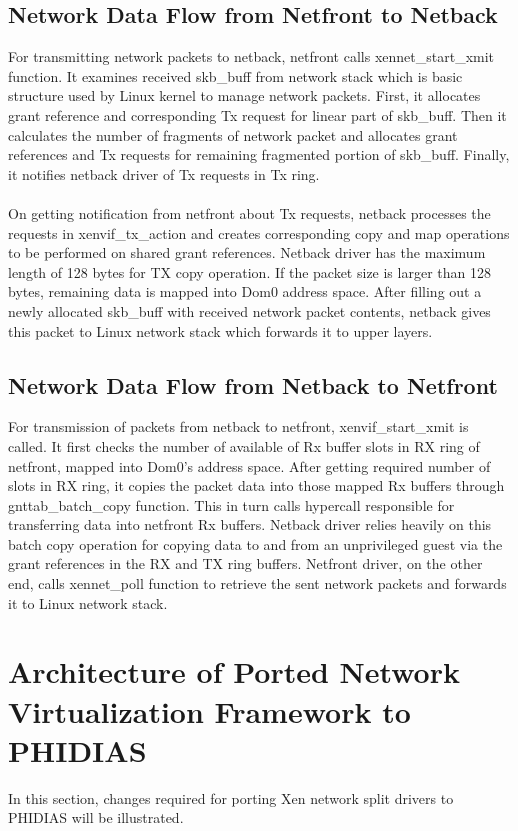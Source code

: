 \subsection{Network Data Flow from Netfront to Netback \label{sec:tx}}
For transmitting network packets to netback, netfront calls xennet\_start\_xmit function. It examines received skb\_buff from network stack which is basic structure used by Linux kernel to manage network packets. First, it allocates grant reference and corresponding Tx request for linear part of skb\_buff. Then it calculates the number of fragments of network packet and allocates grant references and Tx requests for remaining fragmented portion of skb\_buff. Finally, it notifies netback driver of Tx requests in Tx ring. 
\\
\\
On getting notification from netfront about Tx requests, netback processes the requests in xenvif\_tx\_action and creates corresponding copy and map operations to be performed on shared grant references. Netback driver has the maximum length of 128 bytes for TX copy operation. If the packet size is larger than 128 bytes, remaining data is mapped into Dom0 address space. After filling out a newly allocated skb\_buff with received network packet contents, netback gives this packet to Linux network stack which forwards it to upper layers.

\subsection{Network Data Flow from Netback to Netfront \label{sec:rx}}
For transmission of packets from netback to netfront, xenvif\_start\_xmit is called. It first checks the number of available of Rx buffer slots in RX ring of netfront, mapped into Dom0's address space. After getting required number of slots in RX ring, it copies the packet data into those mapped Rx buffers through gnttab\_batch\_copy function. This in turn calls hypercall responsible for transferring data into netfront Rx buffers. Netback driver relies heavily on this batch copy operation for copying data to and from an unprivileged guest via the grant references in the RX and TX ring buffers. Netfront driver, on the other end, calls xennet\_poll function to retrieve the sent network packets and forwards it to Linux network stack.

\section{Architecture of Ported Network Virtualization Framework to PHIDIAS\label{sec:xennetphidias}}
In this section, changes required for porting Xen network split drivers to PHIDIAS will be illustrated. 

